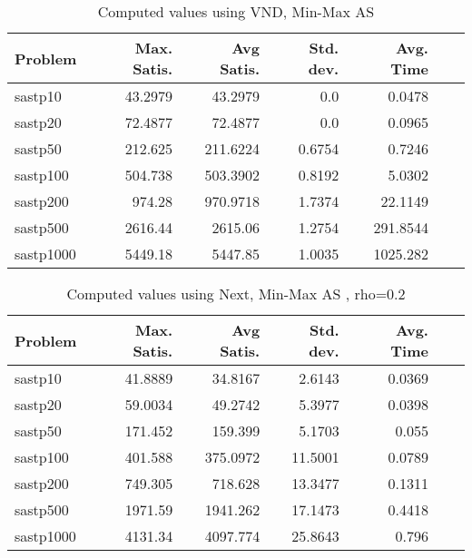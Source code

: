 \documentclass{article}
\begin{document}
\begin{table}[b!]
  \vspace{-6mm}%
  \caption{Computed values using VND, Min-Max AS}
  \label{tab:conf6}
  \setlength{\tabcolsep}{1.4mm}
  \centering
  \begin{tabular}{lrrrrrr}
    \bfseries Problem &
    \bfseries Max. Satis. &
    \bfseries Avg Satis. &
    \bfseries Std. dev. &
    \bfseries Avg. Time 
    \\\hline
    sastp10 & 43.2979 & 43.2979 & 0.0 & 0.0478 \\ 
    sastp20 & 72.4877 & 72.4877 & 0.0 & 0.0965 \\ 
    sastp50 & 212.625 & 211.6224 & 0.6754 & 0.7246 \\ 
    sastp100 & 504.738 & 503.3902 & 0.8192 & 5.0302 \\ 
    sastp200 & 974.28 & 970.9718 & 1.7374 & 22.1149 \\ 
    sastp500 & 2616.44 & 2615.06 & 1.2754 & 291.8544 \\ 
    sastp1000 & 5449.18 & 5447.85 & 1.0035 & 1025.282
    \\\hline
  \end{tabular}

\end{table}

\begin{table}[b!]
  \vspace{-6mm}%
  \caption{Computed values using Next, Min-Max AS , rho=0.2}
  \label{tab:conf7}
  \setlength{\tabcolsep}{1.4mm}
  \centering
  \begin{tabular}{lrrrrrr}
    \bfseries Problem &
    \bfseries Max. Satis. &
    \bfseries Avg Satis. &
    \bfseries Std. dev. &
    \bfseries Avg. Time 
    \\\hline
   sastp10 & 41.8889 & 34.8167 & 2.6143 & 0.0369 \\ 
   sastp20 & 59.0034 & 49.2742 & 5.3977 & 0.0398 \\ 
   sastp50 & 171.452 & 159.399 & 5.1703 & 0.055 \\ 
   sastp100 & 401.588 & 375.0972 & 11.5001 & 0.0789 \\ 
   sastp200 & 749.305 & 718.628 & 13.3477 & 0.1311 \\ 
   sastp500 & 1971.59 & 1941.262 & 17.1473 & 0.4418 \\ 
   sastp1000 & 4131.34 & 4097.774 & 25.8643 & 0.796

    \\\hline
  \end{tabular}

\end{table}
\end{document}
